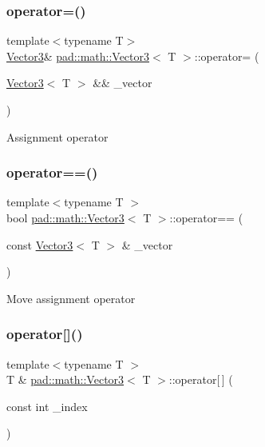 \subsubsection{\texorpdfstring{operator=()}{operator=()}\hspace{0.1cm}{\footnotesize\ttfamily [3/3]}}
{\footnotesize\ttfamily template$<$typename T$>$ \\
\mbox{\hyperlink{structpad_1_1math_1_1_vector3}{Vector3}}\& \mbox{\hyperlink{structpad_1_1math_1_1_vector3}{pad\+::math\+::\+Vector3}}$<$ T $>$\+::operator= (\begin{DoxyParamCaption}\item[{\mbox{\hyperlink{structpad_1_1math_1_1_vector3}{Vector3}}$<$ T $>$ \&\&}]{\+\_\+vector }\end{DoxyParamCaption})\hspace{0.3cm}{\ttfamily [default]}}

Assignment operator \mbox{\label{structpad_1_1math_1_1_vector3_a8366aa2e0deb2f3581c9aa8e9d8838f6}} 
\subsubsection{\texorpdfstring{operator==()}{operator==()}}
{\footnotesize\ttfamily template$<$typename T $>$ \\
bool \mbox{\hyperlink{structpad_1_1math_1_1_vector3}{pad\+::math\+::\+Vector3}}$<$ T $>$\+::operator== (\begin{DoxyParamCaption}\item[{const \mbox{\hyperlink{structpad_1_1math_1_1_vector3}{Vector3}}$<$ T $>$ \&}]{\+\_\+vector }\end{DoxyParamCaption})}

Move assignment operator \mbox{\label{structpad_1_1math_1_1_vector3_af14bcf2fb21a1a991ba711cc00ba1307}} 
\subsubsection{\texorpdfstring{operator[]()}{operator[]()}}
{\footnotesize\ttfamily template$<$typename T $>$ \\
T \& \mbox{\hyperlink{structpad_1_1math_1_1_vector3}{pad\+::math\+::\+Vector3}}$<$ T $>$\+::operator\mbox{[}$\,$\mbox{]} (\begin{DoxyParamCaption}\item[{const int}]{\+\_\+index }\end{DoxyParamCaption})}

